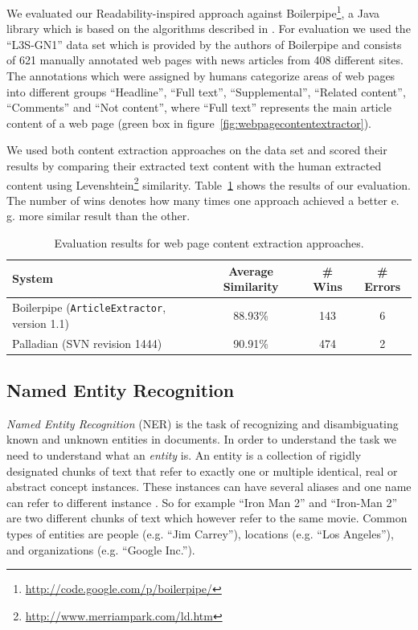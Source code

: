 \documentclass[a4paper,twoside]{book}      %
\begin{document}

We evaluated our Readability-inspired approach against Boilerpipe\footnote{\url{http://code.google.com/p/boilerpipe/}}, a Java library which is based on the algorithms described in \cite{BoilerplateDetectionShallowTextFeatures}. For evaluation we used the ``L3S-GN1'' data set which is provided by the authors of Boilerpipe and consists of 621 manually annotated web pages with news articles from 408 different sites. The annotations which were assigned by humans categorize areas of web pages into different groups ``Headline'', ``Full text'',  ``Supplemental'', ``Related content'', ``Comments'' and  ``Not content'', where ``Full text'' represents the main article content of a web page (green box in figure~\ref{fig:webpagecontentextractor}).

We used both content extraction approaches on the data set and scored their results by comparing their extracted text content with the human extracted content using Levenshtein\footnote{\url{http://www.merriampark.com/ld.htm}} similarity. Table~\ref{tab:pageContentExtractionResults} shows the results of our evaluation. The number of wins denotes how many times one approach achieved a better e. g. more similar result than the other.


\begin{table}[ht]
\centering
\begin{tabular}{|l|c|c|c|}
	\hline
	System & Average Similarity & \# Wins & \# Errors \\ 
	\hline
	Boilerpipe (\texttt{ArticleExtractor}, version 1.1) & 88.93\% & 143 & 6 \\ 
	\hline
	Palladian (SVN revision 1444) & 90.91\% & 474 & 2 \\ 
	\hline
\end{tabular}
\caption{Evaluation results for web page content extraction approaches.}
\label{tab:pageContentExtractionResults}
\end{table}

\subsection{Named Entity Recognition}

{\it Named Entity Recognition} (NER) is the task of recognizing and disambiguating known and unknown entities in documents. In order to understand the task we need to understand what an {\it entity} is. An entity is a collection of rigidly designated chunks of text that refer to exactly one or multiple identical, real or abstract concept instances. These instances can have several aliases and one name can refer to different instance \cite{webknoxblogne}. So for example ``Iron Man 2'' and ``Iron-Man 2'' are two different chunks of text which however refer to the same movie. Common types of entities are people (e.g. ``Jim Carrey''), locations (e.g. ``Los Angeles''), and organizations (e.g. ``Google Inc.'').
\end{document}
